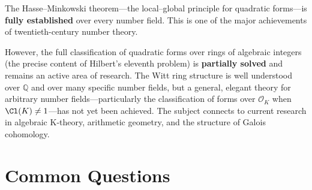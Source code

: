 \begin{partiallybox}
The Hasse--Minkowski theorem---the local--global principle for quadratic forms---is \textbf{fully established} over every number field. This is one of the major achievements of twentieth-century number theory.

However, the full classification of quadratic forms over rings of algebraic integers (the precise content of Hilbert's eleventh problem) is \textbf{partially solved} and remains an active area of research. The Witt ring structure is well understood over $\mathbb{Q}$ and over many specific number fields, but a general, elegant theory for arbitrary number fields---particularly the classification of forms over $\mathcal{O}_K$ when $\Cl(K) \neq 1$---has not yet been achieved. The subject connects to current research in algebraic K-theory, arithmetic geometry, and the structure of Galois cohomology.
\end{partiallybox}

\section*{Common Questions}


